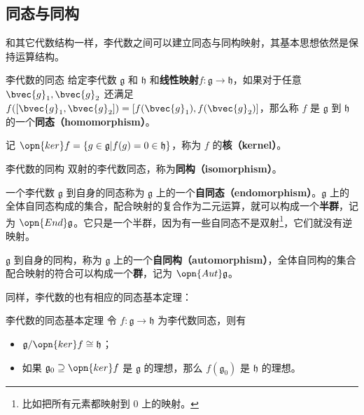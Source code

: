 

\subsection{同态与同构}

和其它代数结构一样，李代数之间可以建立同态与同构映射，其基本思想依然是保持运算结构。

\begin{definition}{李代数的同态}
给定李代数 $\mathfrak{g}$ 和 $\mathfrak{h}$ 和\textbf{线性映射}$f:\mathfrak{g}\to\mathfrak{h}$，如果对于任意 $\bvec{g}_1, \bvec{g}_2$ 还满足 $f([\bvec{g}_1, \bvec{g}_2])=[f(\bvec{g}_1), f(\bvec{g}_2)]$，那么称 $f$ 是 $\mathfrak{g}$ 到 $\mathfrak{h}$ 的一个\textbf{同态（homomorphism）}。

记 $\opn{ker}f =\{g\in\mathfrak{g}|f(g)=0\in\mathfrak{h}\}$，称为 $f$ 的\textbf{核（kernel）}。
\end{definition}

\begin{definition}{李代数的同构}
双射的李代数同态，称为\textbf{同构（isomorphism）}。
\end{definition}

一个李代数 $\mathfrak{g}$ 到自身的同态称为 $\mathfrak{g}$ 上的一个\textbf{自同态（endomorphism）}。$\mathfrak{g}$ 上的全体自同态构成的集合，配合映射的复合作为二元运算，就可以构成一个\textbf{半群}，记为 $\opn{End}\mathfrak{g}$。它只是一个半群，因为有一些自同态不是双射\footnote{比如把所有元素都映射到 $0$ 上的映射。}，它们就没有逆映射。

$\mathfrak{g}$ 到自身的同构，称为 $\mathfrak{g}$ 上的一个\textbf{自同构（automorphism）}，全体自同构的集合配合映射的符合可以构成一个\textbf{群}，记为 $\opn{Aut}\mathfrak{g}$。

同样，李代数的也有相应的同态基本定理：

\begin{definition}{李代数的同态基本定理}
令 $f:\mathfrak{g}\to \mathfrak{h}$ 为李代数同态，则有
\begin{itemize}
\item $\mathfrak{g}/\opn{ker} f\cong \mathfrak{h}$；
\item 如果 $\mathfrak{g}_0\supseteq \opn{ker}f$ 是 $\mathfrak{g}$ 的理想，那么 $f(\mathfrak{g}_0)$ 是 $\mathfrak{h}$ 的理想。
\end{itemize}
\end{definition}


